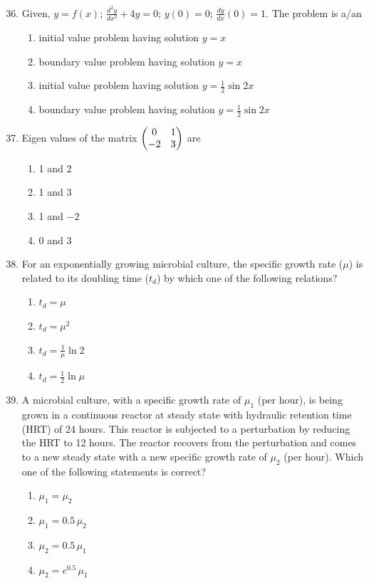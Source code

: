 \documentclass[12pt,a4paper]{article}
\begin{document}
\begin{enumerate}
   \setcounter{enumi}{35}
   \item Given, $y = f(x)$; $\frac{d^2y}{dx^2} + 4y = 0$; $y(0) = 0$; $\frac{dy}{dx}(0) = 1$. The problem is a/an
         \begin{enumerate}
            \item initial value problem having solution $y = x$
            \item boundary value problem having solution $y = x$
            \item initial value problem having solution $y = \frac{1}{2} \sin 2x$
            \item boundary value problem having solution $y = \frac{1}{2} \sin 2x$
         \end{enumerate}

   \item Eigen values of the matrix $\begin{pmatrix} 0 & 1 \\ -2 & 3\end{pmatrix}$ are
         \begin{enumerate}
            \item 1 and 2
            \item 1 and 3
            \item 1 and $-2$
            \item 0 and 3
         \end{enumerate}

   \item For an exponentially growing microbial culture, the specific growth rate ($\mu$) is related to its doubling time ($t_d$) by which one of the following relations?
         \begin{enumerate}
            \item $t_d = \mu$
            \item $t_d = \mu^2$
            \item $t_d = \frac{1}{\mu} \ln 2$
            \item $t_d = \frac{1}{2} \ln \mu$
         \end{enumerate}

   \item A microbial culture, with a specific growth rate of $\mu_1$ (per hour), is being grown in a continuous reactor at steady state with hydraulic retention time (HRT) of 24 hours. This reactor is subjected to a perturbation by reducing the HRT to 12 hours. The reactor recovers from the perturbation and comes to a new steady state with a new specific growth rate of $\mu_2$ (per hour). Which one of the following statements is correct?
         \begin{enumerate}
            \item $\mu_1 = \mu_2$
            \item $\mu_1 = 0.5\,\mu_2$
            \item $\mu_2 = 0.5\,\mu_1$
            \item $\mu_2 = e^{0.5}\,\mu_1$
         \end{enumerate}


\end{enumerate}
\end{document}
